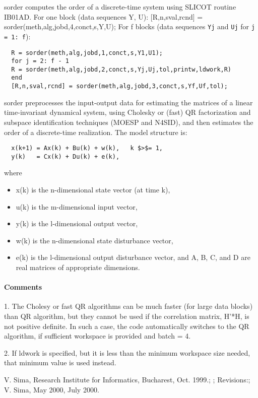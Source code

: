 \begin{mandescription}
  sorder computes the order of a discrete-time system using SLICOT routine
  IB01AD.  For one block (data sequences Y, U): [R,n,sval,rcnd] =
  sorder(meth,alg,jobd,4,conct,s,Y,U); For f blocks (data sequences \verb!Yj! and \verb!Uj! for \verb!j = 1: f!):
\begin{verbatim}
  R = sorder(meth,alg,jobd,1,conct,s,Y1,U1);
  for j = 2: f - 1
  R = sorder(meth,alg,jobd,2,conct,s,Yj,Uj,tol,printw,ldwork,R)
  end
  [R,n,sval,rcnd] = sorder(meth,alg,jobd,3,conct,s,Yf,Uf,tol);
\end{verbatim}
  sorder preprocesses the input-output data for estimating the matrices of a
  linear time-invariant dynamical system, using Cholesky or (fast) QR
  factorization and subspace identification techniques (MOESP and N4SID), and
  then estimates the order of a discrete-time realization.  The model structure
  is:
\begin{verbatim}
  x(k+1) = Ax(k) + Bu(k) + w(k),   k $>$= 1,
  y(k)   = Cx(k) + Du(k) + e(k),
\end{verbatim}
  where  
\begin{itemize}
\item x(k)  is the  n-dimensional state vector (at time k),
\item u(k)  is the  m-dimensional input vector,
\item y(k)  is the  l-dimensional output vector,
\item w(k)  is the  n-dimensional state disturbance vector,
\item e(k)  is the  l-dimensional output disturbance vector,
  and  A, B, C, and D  are real matrices of appropriate dimensions.
\end{itemize}
\end{mandescription}
\paragraph{Comments}
1. The Cholesy or fast QR algorithms can be much faster (for large data blocks)
than QR algorithm, but they cannot be used if the correlation matrix, H'*H, is
not positive definite. In such a case, the code automatically switches to the QR
algorithm, if sufficient workspace is provided and batch = 4.

2. If ldwork is specified, but it is less than the minimum workspace size
needed, that minimum value is used instead.
\begin{manseealso}
     
\end{manseealso}
\begin{authors}
  V. Sima, Research Institute for Informatics, Bucharest, Oct. 1999.; ;  Revisions:;    V. Sima, May 2000, July 2000.  
\end{authors}
